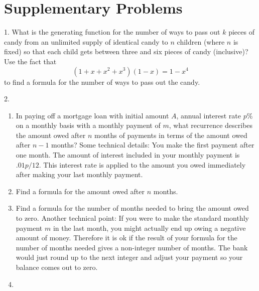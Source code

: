 \documentclass[10pt,]{book}
\theoremstyle{plain}
\theoremstyle{definition}
\theoremstyle{definition}
\numberwithin{equation}{chapter}
\newcommand{\importantarrow}{\Rightarrow}
\begin{document}
\section[{Supplementary Problems}]{Supplementary Problems}\label{sec_genfns-suppprobs}
\begin{exerciselist}
\item[1.]\marginsymbol[-1em]{\pdftooltip{$\importantarrow$\ $*$}{especially interesting and difficult}} \hypertarget{candy-genfn}{}\hypertarget{p-1284}{}%
What is the generating function for the number of ways to pass out \(k\) pieces of candy from an unlimited supply of identical candy to \(n\) children (where \(n\) is fixed) so that each child gets between three and six pieces of candy (inclusive)? Use the fact that%
\begin{equation*}
(1+x+x^2+x^3)(1-x) = 1-x^4
\end{equation*}
to find a formula for the number of ways to pass out the candy.%
\par\smallskip
\item[2.] \hypertarget{exercise-38}{}\hypertarget{p-1286}{}%
\leavevmode%
\begin{enumerate}[label=(\alph*)]
\item\hypertarget{li-79}{}\hypertarget{p-1287}{}%
In paying off a mortgage loan with initial amount \(A\), annual interest rate \(p\)\% on a monthly basis with a monthly payment of \(m\), what recurrence describes the amount owed after \(n\) months of payments in terms of the amount owed after \(n-1\) months?  Some technical details: You make the first payment after one month.  The amount of interest included in your monthly payment is \(.01p/12\).  This interest rate is applied to the amount you owed immediately after making your last monthly payment.%
\item\hypertarget{li-80}{}\hypertarget{p-1288}{}%
Find a formula for the amount owed after \(n\) months.%
\item\hypertarget{li-81}{}\hypertarget{p-1289}{}%
Find a formula for the number of months needed to bring the amount owed to zero.  Another technical point: If you were to make the standard monthly payment \(m\) in the last month, you might actually end up owing a negative amount of money.  Therefore it is ok if the result of your formula for the number of months needed gives a non-integer number of months.  The bank would just round up to the next integer and adjust your payment so your balance comes out to zero.%
\item\hypertarget{li-82}{}\hypertarget{p-1290}{}%

\end{enumerate}
\end{exerciselist}
\end{document}
